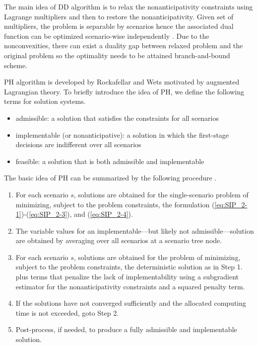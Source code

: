 

The main idea of DD algorithm is to relax the nonanticipativity constraints using Lagrange multipliers and then to restore the nonanticipativity. Given set of multipliers, the problem is separable by scenarios hence the associated dual function can be optimized scenario-wise independently \cite{journal:CS1999}. Due to the nonconvexities, there can exist a duality gap between relaxed problem and the original problem so the optimality needs to be attained branch-and-bound scheme. 

PH algorithm is developed by Rockafellar and Wets \cite{journal:RW1991} motivated by augmented Lagrangian theory. To briefly introduce the idea of PH, we define the following terms for solution systems.
\begin{itemize}
	\item admissible: a solution that satisfies the constraints for all scenarios
	\item implementable (or nonanticipative): a solution in which the first-stage decisions are indifferent over all scenarios
	\item feasible: a solution that is both admissible and implementable
\end{itemize}
The basic idea of PH can be summarized by the following procedure \cite{book:pyomo}.
\begin{enumerate}
	\item For each scenario $s$, solutions are obtained for the single-scenario problem of minimizing, subject to the problem constraints, the formulation (\ref{eq:SIP_2-1})-(\ref{eq:SIP_2-3}), and (\ref{eq:SIP_2-4}).
	\item The variable values for an implementable---but likely not admissible---solution are obtained by averaging over all scenarios at a scenario tree node.
	\item For each scenario $s$, solutions are obtained for the problem of minimizing, subject to the problem constraints, the deterministic solution as in Step 1. plus terms that penalize the lack of implementability using a subgradient estimator for the nonanticipativity constraints and a squared penalty term.
	\item If the solutions have not converged sufficiently and the allocated computing time is not exceeded, goto Step 2.
	\item Post-process, if needed, to produce a fully admissible and implementable solution.
\end{enumerate}

